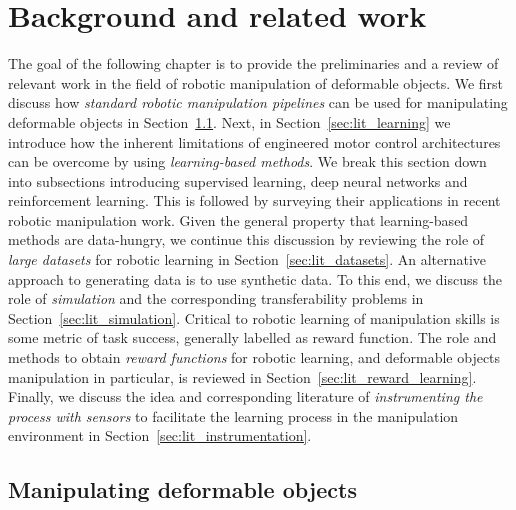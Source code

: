\documentclass[\home/main.tex]{subfiles}
\begin{document}
\chapter{Background and related work}\label{ch:lit} 

The goal of the following chapter is to provide the preliminaries and a review of relevant work in the field of robotic manipulation of deformable objects. We first discuss how \emph{standard robotic manipulation pipelines} can be used for manipulating deformable objects in Section~\ref{sec:lit_traditional}. Next, in Section~\ref{sec:lit_learning} we introduce how the inherent limitations of engineered motor control architectures can be overcome by using \emph{learning-based methods}. We break this section down into subsections introducing supervised learning, deep neural networks and reinforcement learning. This is followed by surveying their applications in recent robotic manipulation work. Given the general property that learning-based methods are data-hungry, we continue this discussion by reviewing the role of \emph{large datasets} for robotic learning in Section~\ref{sec:lit_datasets}. An alternative approach to generating data is to use synthetic data. To this end, we discuss the role of \emph{simulation} and the corresponding transferability problems in Section~\ref{sec:lit_simulation}. Critical to robotic learning of manipulation skills is some metric of task success, generally labelled as reward function. The role and methods to obtain \emph{reward functions} for robotic learning, and deformable objects manipulation in particular, is reviewed in Section~\ref{sec:lit_reward_learning}. Finally, we discuss the idea and corresponding literature of \emph{instrumenting the process with sensors} to facilitate the learning process in the manipulation environment in Section~\ref{sec:lit_instrumentation}.


\section{Manipulating deformable objects} \label{sec:lit_traditional}
\end{document}
